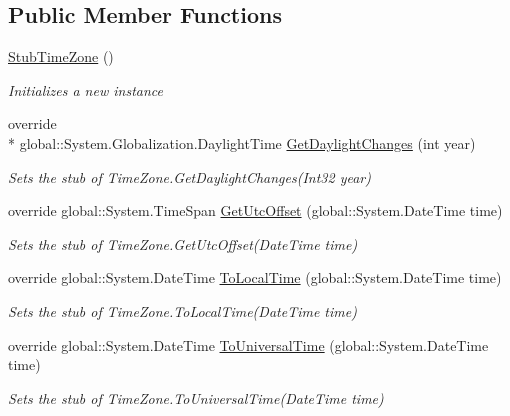\subsection*{Public Member Functions}
\begin{DoxyCompactItemize}
\item 
\hyperlink{class_system_1_1_fakes_1_1_stub_time_zone_afeabad3a74cc9eb5ce1cc447fcd57781}{Stub\-Time\-Zone} ()
\begin{DoxyCompactList}\small\item\em Initializes a new instance\end{DoxyCompactList}\item 
override \\*
global\-::\-System.\-Globalization.\-Daylight\-Time \hyperlink{class_system_1_1_fakes_1_1_stub_time_zone_aa45003cfdaae01d3cc0b9f92972d3bef}{Get\-Daylight\-Changes} (int year)
\begin{DoxyCompactList}\small\item\em Sets the stub of Time\-Zone.\-Get\-Daylight\-Changes(\-Int32 year)\end{DoxyCompactList}\item 
override global\-::\-System.\-Time\-Span \hyperlink{class_system_1_1_fakes_1_1_stub_time_zone_a4868e505dab48ac99e8e92c5c58a7bc2}{Get\-Utc\-Offset} (global\-::\-System.\-Date\-Time time)
\begin{DoxyCompactList}\small\item\em Sets the stub of Time\-Zone.\-Get\-Utc\-Offset(\-Date\-Time time)\end{DoxyCompactList}\item 
override global\-::\-System.\-Date\-Time \hyperlink{class_system_1_1_fakes_1_1_stub_time_zone_a17f18f4f300292f5dd5242e42368e08b}{To\-Local\-Time} (global\-::\-System.\-Date\-Time time)
\begin{DoxyCompactList}\small\item\em Sets the stub of Time\-Zone.\-To\-Local\-Time(\-Date\-Time time)\end{DoxyCompactList}\item 
override global\-::\-System.\-Date\-Time \hyperlink{class_system_1_1_fakes_1_1_stub_time_zone_a5b90aec9774ffc64f37577f3026d3c75}{To\-Universal\-Time} (global\-::\-System.\-Date\-Time time)
\begin{DoxyCompactList}\small\item\em Sets the stub of Time\-Zone.\-To\-Universal\-Time(\-Date\-Time time)\end{DoxyCompactList}\end{DoxyCompactItemize}
